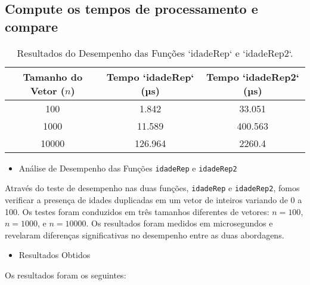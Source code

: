 \subsection{Compute os tempos de processamento e compare}

\begin{table}[ht]
    \centering
    \caption{Resultados do Desempenho das Funções `idadeRep` e `idadeRep2`.}
    \begin{tabular}{@{}ccc@{}}
        \toprule
        Tamanho do Vetor (\(n\)) & Tempo `idadeRep` (µs) & Tempo `idadeRep2` (µs) \\ \midrule
        100       & 1.842               & 33.051               \\
        1000      & 11.589              & 400.563              \\
        10000     & 126.964             & 2260.4               \\ \bottomrule
    \end{tabular}
\end{table}

\begin{itemize}
    \item Análise de Desempenho das Funções \texttt{idadeRep} e \texttt{idadeRep2}
\end{itemize}
Através do teste de desempenho nas duas funções, \texttt{idadeRep} e \texttt{idadeRep2}, fomos verificar a presença de idades duplicadas em um vetor de inteiros variando de 0 a 100. Os testes foram conduzidos em três tamanhos diferentes de vetores: \( n = 100 \), \( n = 1000 \), e \( n = 10000 \). Os resultados foram medidos em microsegundos e revelaram diferenças significativas no desempenho entre as duas abordagens.

\begin{itemize}
    \item Resultados Obtidos
\end{itemize}
Os resultados foram os seguintes:

